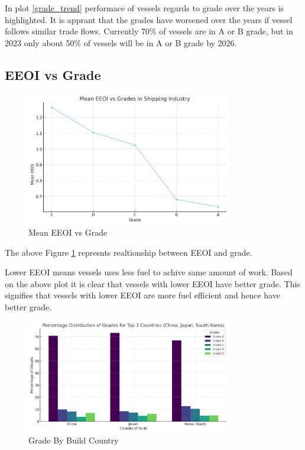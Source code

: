 In plot \ref{grade_trend} performace of vessels regards to grade over the years is highlighted.
It is apprant that the grades have worsened over the years if vessel follows similar trade flows.
Currently 70\% of vessels are in A or B grade, but in 2023 only about 50\% of vessels will be in A or B grade by 2026.

\newpage

\subsection{EEOI vs Grade}

\begin{figure}[h]
    \centering
    \includegraphics[width=0.8\textwidth]{images/eeoi_grade.png}
    \caption{Mean EEOI vs Grade}
    \label{eeoi_grade}
\end{figure}

The above Figure \ref{eeoi_grade} represnts realtionship between EEOI and grade.

Lower EEOI means vessels uses less fuel to achive same amount of work.
Based on the above plot it is clear that vessels with lower EEOI have better grade.
This signifies that vessels with lower EEOI are more fuel efficient and hence have better grade.


\begin{figure}[h]
    \centering
    \includegraphics[width=0.8\textwidth]{images/grade_by_build_country.png}
    \caption{Grade By Build Country}
    \label{grade_by_build_country}
\end{figure}
